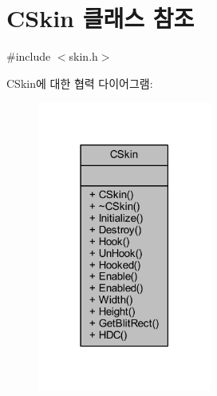\hypertarget{class_c_skin}{}\section{C\+Skin 클래스 참조}
\label{class_c_skin}


{\ttfamily \#include $<$skin.\+h$>$}



C\+Skin에 대한 협력 다이어그램\+:\nopagebreak
\begin{figure}[H]
\begin{center}
\leavevmode
\includegraphics[width=162pt]{class_c_skin__coll__graph}
\end{center}
\end{figure}
